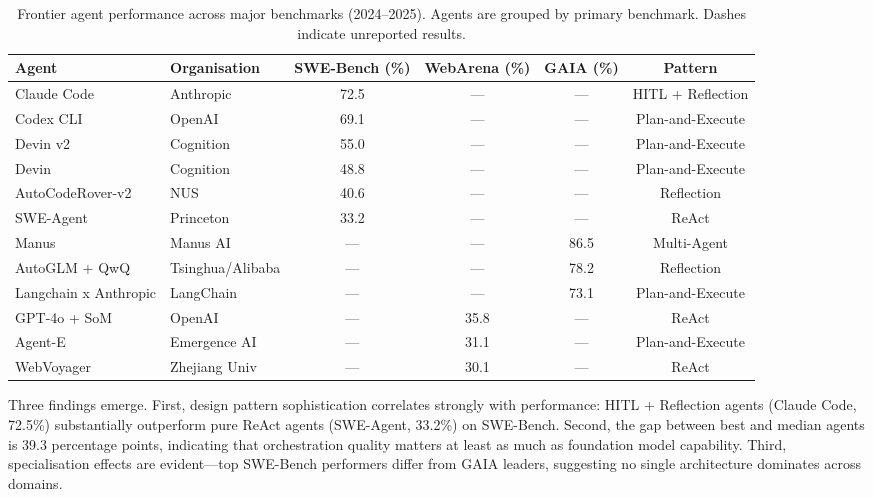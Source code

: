 \documentclass[sn-basic]{sn-jnl}
\theoremstyle{definition}
\begin{document}
\FloatBarrier
\begin{table}[!htbp]
\centering\footnotesize
\caption{Frontier agent performance across major benchmarks (2024--2025). Agents are grouped by primary benchmark. Dashes indicate unreported results.}
\label{tab:benchmarks}
\begin{tabular}{@{}llcccc@{}}
\toprule
\textbf{Agent} & \textbf{Organisation} & \textbf{SWE-Bench (\%)} & \textbf{WebArena (\%)} & \textbf{GAIA (\%)} & \textbf{Pattern} \\
\midrule
Claude Code         & Anthropic      & 72.5 & ---  & ---  & HITL + Reflection \\
Codex CLI           & OpenAI         & 69.1 & ---  & ---  & Plan-and-Execute \\
Devin v2            & Cognition      & 55.0 & ---  & ---  & Plan-and-Execute \\
Devin               & Cognition      & 48.8 & ---  & ---  & Plan-and-Execute \\
AutoCodeRover-v2    & NUS            & 40.6 & ---  & ---  & Reflection \\
SWE-Agent           & Princeton      & 33.2 & ---  & ---  & ReAct \\
Manus               & Manus AI       & ---  & ---  & 86.5 & Multi-Agent \\
AutoGLM + QwQ       & Tsinghua/Alibaba & --- & ---  & 78.2 & Reflection \\
Langchain x Anthropic & LangChain    & ---  & ---  & 73.1 & Plan-and-Execute \\
GPT-4o + SoM        & OpenAI         & ---  & 35.8 & ---  & ReAct \\
Agent-E             & Emergence AI   & ---  & 31.1 & ---  & Plan-and-Execute \\
WebVoyager          & Zhejiang Univ  & ---  & 30.1 & ---  & ReAct \\
\bottomrule
\end{tabular}
\end{table}

Three findings emerge. First, design pattern sophistication correlates strongly with performance: HITL + Reflection agents (Claude Code, 72.5\%) substantially outperform pure ReAct agents (SWE-Agent, 33.2\%) on SWE-Bench. Second, the gap between best and median agents is 39.3 percentage points, indicating that orchestration quality matters at least as much as foundation model capability. Third, specialisation effects are evident---top SWE-Bench performers differ from GAIA leaders, suggesting no single architecture dominates across domains.
\end{document}
